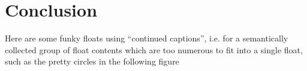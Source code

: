\chapter{Conclusion}
\label{chap:conclusion}

Here are some funky floats using ``continued captions'', i.e. for a semantically
collected group of float contents which are too numerous to fit into a single
float, such as the pretty circles in the following figure
